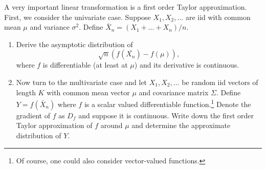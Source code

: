 \documentclass{article}
\begin{document}
A very important linear transformation is a first order Taylor
approximation. First, we consider the univariate case. Suppose $X_1,X_2,\dots$ are iid with common mean $\mu$ and variance $\sigma^{2}$. Define $\bar{X}_n=(X_1+\dots+X_n)/n$.

\begin{enumerate}
\item  Derive the asymptotic distribution of $$\sqrt{n}(f(\bar{X_n})-f(\mu)),$$ where $f$ is differentiable (at least at $\mu $) and its derivative is continuous.
\item Now turn to the multivariate case and let $X_1,X_2,\dots$ be random iid vectors of length $K$ with common mean vector $\mu$ and covariance matrix $\Sigma$. Define $Y=f(\bar{X}_n)$ where $f$ is a scalar valued differentiable function.\footnote{%
Of course, one could also consider vector-valued functions.} Denote the gradient of $f$ as $D_{f}$ and suppose it is continuous. Write down the first order Taylor approximation of $f$ around $\mu $ and determine the approximate distribution of $Y.$
\end{enumerate}
\end{document}
